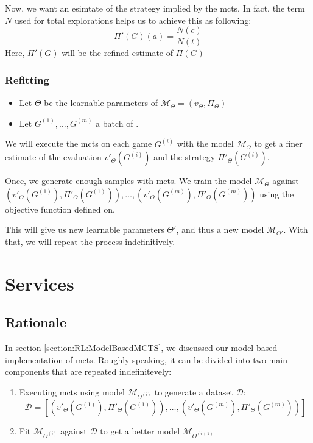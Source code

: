 Now, we want an esimtate of the strategy implied by the \acrshort{mcts}. In fact, the  term $N$ used for total explorations helps us to achieve this as following:
\begin{equation}
	\Pi'(G)(a) = \frac{N(c)}{N(t)} 
\end{equation}
Here, $\Pi'(G)$ will be the refined estimate of $\Pi(G)$

\subsubsection{Refitting}
\begin{itemize}
	\item Let $\Theta$ be the learnable parameters of $\mathcal{M}_\Theta=(v_{\Theta},\Pi_{\Theta})$
	\item Let $G^{(1)},\dots,G^{(m)}$ a batch of .
\end{itemize}
We will execute the \acrshort{mcts} on each game $G^{(i)}$ with the model $\mathcal{M}_{\Theta}$ to get a finer estimate of the evaluation $v'_{\Theta}(G^{(i)})$ and the strategy $\Pi'_{\Theta}(G^{(i)}).$

Once, we generate enough samples with \acrshort{mcts}. We train the model $\mathcal{M}_{\Theta}$ against \newline $(v'_{\Theta}(G^{(1)}),\Pi'_{\Theta}(G^{(1)})), \dots,(v'_{\Theta}(G^{(m)}),\Pi'_{\Theta}(G^{(m)}))$ using the objective function defined on.

This will give us new learnable parameters $\Theta'$, and thus a new model $\mathcal{M}_{\Theta'}.$ With that, we will repeat the process indefinitively.


\section{Services}
\subsection{Rationale}
In section \ref{section:RL:ModelBasedMCTS}, we discussed our model-based implementation of \acrshort{mcts}. Roughly speaking, it can be divided into two main components that are repeated indefinitevely:
\begin{enumerate}
	\item Executing \acrshort{mcts} using model $\mathcal{M}_{\Theta^{(i)}}$ to generate a dataset $\mathcal{D}$: $$
	\mathscr{D}=\left[(v'_{\Theta}(G^{(1)}),\Pi'_{\Theta}(G^{(1)})), \dots,(v'_{\Theta}(G^{(m)}),\Pi'_{\Theta}(G^{(m)}))\right]
	$$
	\item Fit $\mathcal{M}_{\Theta^{(i)}}$ against $\mathscr{D}$ to get a better model $\mathcal{M}_{\Theta^{(i+1)}}$
\end{enumerate}


